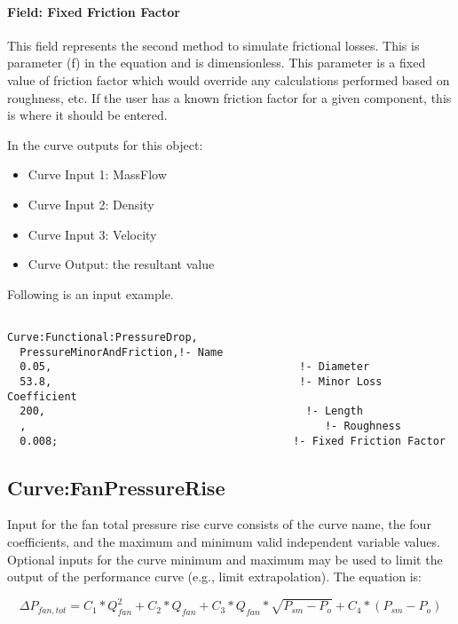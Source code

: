 \paragraph{Field: Fixed Friction Factor}\label{field-fixed-friction-factor}

This field represents the second method to simulate frictional losses. This is parameter (f) in the equation and is dimensionless. This parameter is a fixed value of friction factor which would override any calculations performed based on roughness, etc. If the user has a known friction factor for a given component, this is where it should be entered.

In the curve outputs for this object:

\begin{itemize}
\item
  Curve Input 1: MassFlow
\item
  Curve Input 2: Density
\item
  Curve Input 3: Velocity
\item
  Curve Output: the resultant value
\end{itemize}

Following is an input example.

\begin{lstlisting}

Curve:Functional:PressureDrop,
  PressureMinorAndFriction,!- Name
  0.05,                                       !- Diameter
  53.8,                                       !- Minor Loss Coefficient
  200,                                         !- Length
  ,                                               !- Roughness
  0.008;                                     !- Fixed Friction Factor
\end{lstlisting}

\subsection{Curve:FanPressureRise}\label{curvefanpressurerise}

Input for the fan total pressure rise curve consists of the curve name, the four coefficients, and the maximum and minimum valid independent variable values. Optional inputs for the curve minimum and maximum may be used to limit the output of the performance curve (e.g., limit extrapolation). The equation is:

\begin{equation}
\Delta {P_{fan,tot}} = {C_1}*Q_{fan}^2 + {C_2}*Q_{fan}^{} + {C_3}*Q_{fan}^{}*\sqrt {{P_{sm}} - {P_o}}  + {C_4}*\left( {{P_{sm}} - {P_o}} \right)
\end{equation}

